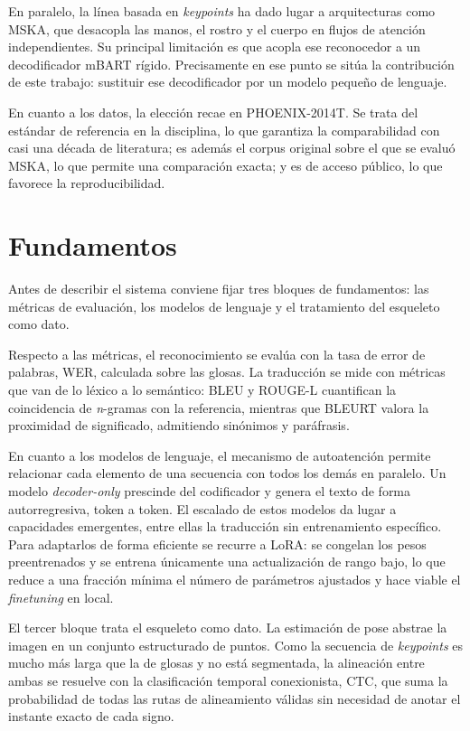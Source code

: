 \documentclass[11pt]{article}
\begin{document}
En paralelo, la línea basada en \textit{keypoints} ha dado lugar a arquitecturas como MSKA, que desacopla las manos, el rostro y el cuerpo en flujos de atención independientes. Su principal limitación es que acopla ese reconocedor a un decodificador mBART rígido. Precisamente en ese punto se sitúa la contribución de este trabajo: sustituir ese decodificador por un modelo pequeño de lenguaje.

En cuanto a los datos, la elección recae en PHOENIX-2014T. Se trata del estándar de referencia en la disciplina, lo que garantiza la comparabilidad con casi una década de literatura; es además el corpus original sobre el que se evaluó MSKA, lo que permite una comparación exacta; y es de acceso público, lo que favorece la reproducibilidad.

\section{Fundamentos}

Antes de describir el sistema conviene fijar tres bloques de fundamentos: las métricas de evaluación, los modelos de lenguaje y el tratamiento del esqueleto como dato.

Respecto a las métricas, el reconocimiento se evalúa con la tasa de error de palabras, WER, calculada sobre las glosas. La traducción se mide con métricas que van de lo léxico a lo semántico: BLEU y ROUGE-L cuantifican la coincidencia de \textit{n}-gramas con la referencia, mientras que BLEURT valora la proximidad de significado, admitiendo sinónimos y paráfrasis.

En cuanto a los modelos de lenguaje, el mecanismo de autoatención permite relacionar cada elemento de una secuencia con todos los demás en paralelo. Un modelo \textit{decoder-only} prescinde del codificador y genera el texto de forma autorregresiva, token a token. El escalado de estos modelos da lugar a capacidades emergentes, entre ellas la traducción sin entrenamiento específico. Para adaptarlos de forma eficiente se recurre a LoRA: se congelan los pesos preentrenados y se entrena únicamente una actualización de rango bajo, lo que reduce a una fracción mínima el número de parámetros ajustados y hace viable el \textit{finetuning} en local.

El tercer bloque trata el esqueleto como dato. La estimación de pose abstrae la imagen en un conjunto estructurado de puntos. Como la secuencia de \textit{keypoints} es mucho más larga que la de glosas y no está segmentada, la alineación entre ambas se resuelve con la clasificación temporal conexionista, CTC, que suma la probabilidad de todas las rutas de alineamiento válidas sin necesidad de anotar el instante exacto de cada signo.
\end{document}
